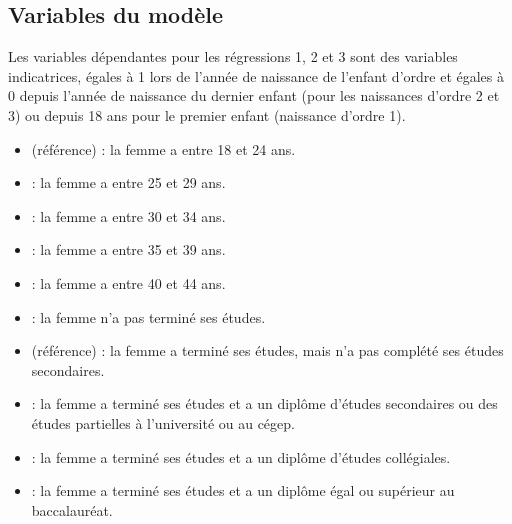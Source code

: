 \documentclass[letterpaper,10pt,french]{sphinxmanual}
\begin{document}
\subsection{Variables du modèle}
\label{\detokenize{methodologie:variables-du-modele}}
Les variables dépendantes pour les régressions 1, 2 et 3 sont des variables indicatrices,
égales à 1 lors de l’année de naissance de l’enfant d’ordre 
et égales à 0 depuis l’année de naissance du dernier enfant (pour les naissances d’ordre 2 et 3) ou
depuis 18 ans pour le premier enfant (naissance d’ordre 1).

\begin{itemize}
\item {} 
 (référence) : la femme a entre 18 et 24 ans.

\item {} 
 : la femme a entre 25 et 29 ans.

\item {} 
 : la femme a entre 30 et 34 ans.

\item {} 
 : la femme a entre 35 et 39 ans.

\item {} 
 : la femme a entre 40 et 44 ans.

\end{itemize}

\begin{itemize}
\item {} 
 : la femme n’a pas terminé ses études.

\item {} 
 (référence) : la femme a terminé ses études, mais n’a pas complété ses études secondaires.

\item {} 
 : la femme a terminé ses études et a un diplôme d’études secondaires ou des études partielles à l’université ou au cégep.

\item {} 
 : la femme a terminé ses études et a un diplôme d’études collégiales.

\item {} 
 : la femme a terminé ses études et a un diplôme égal ou supérieur au baccalauréat.

\end{itemize}
\end{document}
